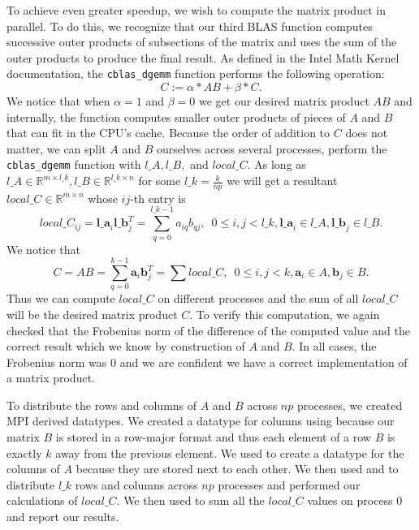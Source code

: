 \documentclass[11pt]{article}
\begin{document}
To achieve even greater speedup, we wish to compute the matrix product in parallel. To do this, we recognize that our third BLAS function computes successive outer products of subsections of the matrix and uses the sum of the outer products to produce the final result. As defined in the Intel Math Kernel documentation, the \texttt{cblas\_dgemm} function performs the following operation:
$$ C := \alpha*AB + \beta*C. $$
We notice that when $\alpha=1$ and $\beta=0$ we get our desired matrix product $AB$ and internally, the function computes smaller outer products of pieces of $A$ and $B$ that can fit in the CPU's cache. Because the order of addition to $C$ does not matter, we can split $A$ and $B$ ourselves across several processes, perform the \texttt{cblas\_dgemm} function with $l\_A, l\_B,$ and $local\_C$. As long as $l\_A \in \mathbb{R}^{m \times l\_k}, l\_B \in \mathbb{R}^{l\_k \times n}$ for some $l\_k=\frac{k}{np}$ we will get a resultant $local\_C \in \mathbb{R}^{m \times n}$ whose $ij$-th entry is
$$ local\_C_{ij} = \mathbf{l\_a}_i \mathbf{l\_b}_j^T = \sum_{q=0}^{l\_k-1} {a_{iq}b_{qj}}, \enspace 0 \leq i,j < l\_k, \mathbf{l\_a}_{i} \in l\_A, \mathbf{l\_b}_{j} \in l\_B. $$
We notice that
$$ C = AB = \sum_{q=0}^{k-1} {\mathbf{a}_{i}\mathbf{b}_{j}^{T}} = \sum {local\_C}, \enspace 0 \leq i,j < k, \mathbf{a}_i\in A, \mathbf{b}_j \in B.$$
Thus we can compute $local\_C$ on different processes and the sum of all $local\_C$ will be the desired matrix product $C$. To verify this computation, we again checked that the Frobenius norm of the difference of the computed value and the correct result which we know by construction of $A$ and $B$. In all cases, the Frobenius norm was $0$ and we are confident we have a correct implementation of a matrix product.

To distribute the rows and columns of $A$ and $B$ across $np$ processes, we created MPI derived datatypes. We created a datatype for columns using  because our matrix $B$ is stored in a row-major format and thus each element of a row $B$ is exactly $k$ away from the previous element. We used  to create a datatype for the columns of $A$ because they are stored next to each other. We then used  and  to distribute $l\_k$ rows and columns across $np$ processes and performed our calculations of $local\_C$. We then used  to sum all the $local\_C$ values on process $0$ and report our results.

\end{document}
